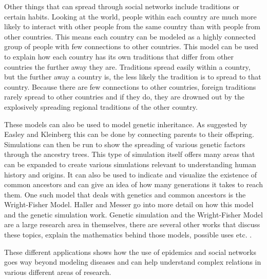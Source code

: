 Other things that can spread through social networks include traditions or certain habits.
Looking at the world, people within each country are much more likely to interact with other people from the same country than with people from other countries. This means each
country can be modeled as a highly connected group of people with few connections to other
countries. This model can be used to explain how each country has its own traditions that
differ from other countries the further away they are. Traditions spread easily within 
a country, but the further away a country is, the less likely the tradition is to spread to that country.
Because there are few connections to other countries, foreign traditions rarely spread to other countries and if they do, they are drowned out by the explosively spreading regional traditions of the other country.

These models can also be used to model genetic inheritance. As suggested by
Easley and Kleinberg \cite{networks} this can be done by connecting parents to their offspring.
Simulations can then be run to show the spreading of various genetic factors through
the ancestry trees. This type of simulation itself offers many areas that can be expanded
to create various simulations relevant to understanding human history and origins. 
It can also be used to indicate and visualize the existence of common ancestors and 
can give an idea of how many generations it takes to reach them. One such model that deals
with genetics and common ancestors is the Wright-Fisher Model. Haller and Messer \cite{genetics}
go into more detail on how this model and the genetic simulation work. Genetic simulation 
and the Wright-Fisher Model are a large research area in themselves, there are several other
works that discuss these topics, explain the mathematics behind those models, 
possible uses etc. \cite{genetics2} \cite{genetics3} \cite{genetics4}.


These different applications shows how the use of epidemics and social networks goes way beyond modeling diseases and can help understand complex relations in various different areas of research.